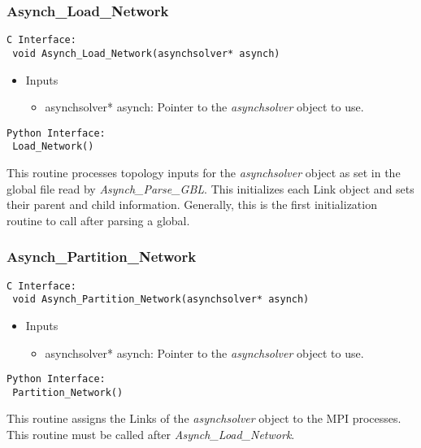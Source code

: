 \documentclass[12pt]{article}
\begin{document}
\subsubsection{Asynch\_Load\_Network} \label{sec: asynch_load_network}

\begin{lstlisting}[style=CStyle]
 C Interface:
 void Asynch_Load_Network(asynchsolver* asynch)
\end{lstlisting}
\begin{itemize}
 \item Inputs
  \begin{itemize}
   \item asynchsolver* asynch: Pointer to the \emph{asynchsolver} object to use.
  \end{itemize}
\end{itemize}
\begin{lstlisting}[style=PythonStyle]
 Python Interface:
 Load_Network()
\end{lstlisting}
This routine processes topology inputs for the \emph{asynchsolver} object as set in the global file read by \emph{Asynch\_Parse\_GBL}. This initializes each Link object and sets their parent and child information. Generally, this is the first initialization routine to call after parsing a global.


\subsubsection{Asynch\_Partition\_Network} \label{sec: asynch_partition_network}

\begin{lstlisting}[style=CStyle]
 C Interface:
 void Asynch_Partition_Network(asynchsolver* asynch)
\end{lstlisting}
\begin{itemize}
 \item Inputs
  \begin{itemize}
   \item asynchsolver* asynch: Pointer to the \emph{asynchsolver} object to use.
  \end{itemize}
\end{itemize}
\begin{lstlisting}[style=PythonStyle]
 Python Interface:
 Partition_Network()
\end{lstlisting}
This routine assigns the Links of the \emph{asynchsolver} object to the MPI processes. This routine must be called after \emph{Asynch\_Load\_Network}.
\end{document}

